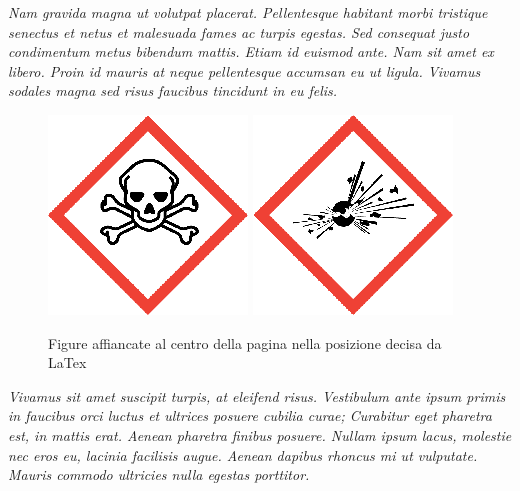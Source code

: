 \textit{Nam gravida magna ut volutpat placerat. Pellentesque habitant morbi tristique senectus et netus et malesuada fames ac turpis egestas. Sed consequat justo condimentum metus bibendum mattis. Etiam id euismod ante. Nam sit amet ex libero. Proin id mauris at neque pellentesque accumsan eu ut ligula. Vivamus sodales magna sed risus faucibus tincidunt in eu felis.}

\begin{figure}
    \centering
    \includegraphics[scale=0.2]{img/pittogrammi/Acute toxicity.png}
    \includegraphics[scale=0.2]{img/pittogrammi/Explosive.png}
    \caption{Figure affiancate al centro della pagina nella posizione decisa da LaTex}
    \label{fig:4}
\end{figure}

\textit{Vivamus sit amet suscipit turpis, at eleifend risus. Vestibulum ante ipsum primis in faucibus orci luctus et ultrices posuere cubilia curae; Curabitur eget pharetra est, in mattis erat. Aenean pharetra finibus posuere. Nullam ipsum lacus, molestie nec eros eu, lacinia facilisis augue. Aenean dapibus rhoncus mi ut vulputate. Mauris commodo ultricies nulla egestas porttitor.}

